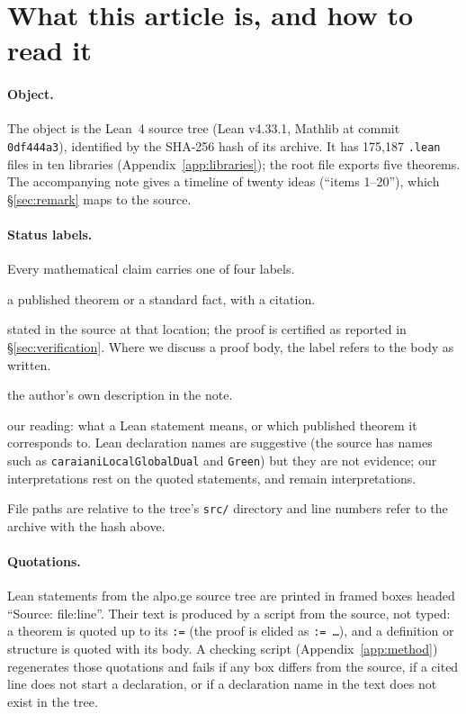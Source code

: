 \section{What this article is, and how to read it}\label{sec:reading}

\paragraph{Object.} The object is the Lean~4 source tree \cite{alpotree} (Lean v4.33.1, Mathlib at
commit \texttt{0df444a3}), identified by the SHA-256 hash of its archive. It has 175{,}187
\texttt{.lean} files in ten libraries (Appendix~\ref{app:libraries}); the root file
 exports five theorems. The accompanying note \cite{remark} gives a
timeline of twenty ideas (``items 1--20''), which \S\ref{sec:remark} maps to the source.

\paragraph{Status labels.} Every mathematical claim carries one of four labels.
\begin{description}[font=\normalfont]
\item[\sttag{classical}] a published theorem or a standard fact, with a citation.
\item[\sttag{Lean: file:line}] stated in the source at that location; the proof is certified as
  reported in \S\ref{sec:verification}. Where we discuss a proof body, the label refers to the body
  as written.
\item[\sttag{remark, item $n$}] the author's own description in the note.
\item[\sttag{interpretation}] our reading: what a Lean statement means, or which published theorem
  it corresponds to. Lean declaration names are suggestive (the source has names such as
  \texttt{caraianiLocalGlobalDual} and \texttt{Green}) but they are not evidence; our
  interpretations rest on the quoted statements, and remain interpretations.
\end{description}
File paths are relative to the tree's \texttt{src/} directory and line numbers refer to the archive
with the hash above.

\paragraph{Quotations.} Lean statements from the alpo.ge source tree are printed in framed boxes headed ``Source: file:line''.
Their text is produced by a script from the source, not typed: a theorem is quoted up to its
\texttt{:=} (the proof is elided as \texttt{:= …}), and a definition or structure is quoted with its
body. A checking script (Appendix~\ref{app:method}) regenerates those quotations and fails if any
box differs from the source, if a cited line does not start a declaration, or if a declaration name
in the text does not exist in the tree.

